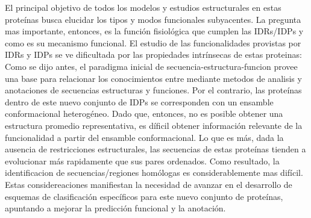 El principal objetivo de todos los modelos y estudios estructurales en estas proteínas busca elucidar los tipos y modos funcionales subyacentes.
La pregunta mas importante, entonces, es la función fisiológica que cumplen las IDRs/IDPs y como es su mecanismo funcional.
El estudio de las funcionalidades provistas por IDRs y IDPs se ve dificultada por las propiedades intrínsecas de estas proteinas:
Como se dijo antes, el paradigma inicial de secuencia-estructura-funcion provee una base para relacionar los conocimientos entre mediante metodos de analisis y anotaciones de secuencias estructuras y funciones.
Por el contrario, las proteínas dentro de este nuevo conjunto de IDPs se corresponden con un ensamble conformacional heterogéneo.
Dado que, entonces, no es posible obtener una estructura promedio representativa, es díficil obtener información relevante de la funcionalidad a partir del ensamble conformacional.
Lo que es más, dada la ausencia de restricciones estructurales, las secuencias de estas proteínas tienden a evolucionar más rapidamente que sus pares ordenados.
Como resultado, la identificacion de secuencias/regiones homólogas es considerablemente mas difícil.
Estas considereaciones manifiestan la necesidad de avanzar en el desarrollo de esquemas de clasificación específicos para este nuevo conjunto de proteínas, apuntando a mejorar la predicción funcional y la anotación.

